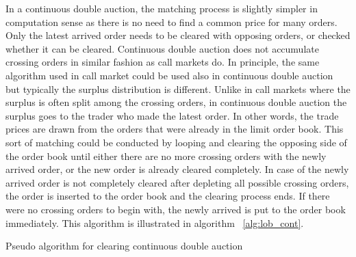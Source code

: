 In a continuous double auction, the matching process is slightly simpler in computation
sense as there is no need to find a common price for many orders. Only the latest arrived
order needs to be cleared with opposing orders, or checked whether it can be cleared. Continuous
double auction does not accumulate crossing orders in similar fashion as call markets do. 
In principle, the same algorithm used in call market could be used also in continuous double auction 
but typically the surplus distribution is different. Unlike in call markets where the surplus is often
split among the crossing orders, in continuous double auction the surplus goes to the trader who made the 
latest order. In other words, the trade prices are drawn from the orders that were already in the limit 
order book. This sort of matching could be conducted by looping and clearing the opposing side of the 
order book until either there are no more crossing orders with the newly arrived order, or the new 
order is already cleared completely. In case of the newly arrived order is not completely cleared after 
depleting all possible crossing orders, the order is inserted to the order book and the clearing process 
ends. If there were no crossing orders to begin with, the newly arrived is put to the order book immediately. 
This algorithm is illustrated in algorithm ~\ref{alg:lob_cont}. %

\begin{algorithm}[H]
    \SetAlgoLined
    \DontPrintSemicolon

    \caption{Pseudo algorithm for clearing continuous double auction}
    \label{alg:lob_cont}
\end{algorithm}


